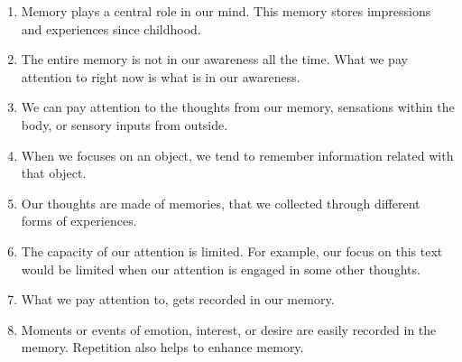 \documentclass[reprint,amsmath,amssymb,apr,aip,onecolumn, 11pt]{revtex4-1}
\begin{document}
	\begin{enumerate}
		\item Memory plays a central role in our mind. This memory stores impressions and experiences since childhood. 
		
		\item	The entire memory is not in our awareness all the time. What we pay attention to right now is what is in our awareness. 
		
		\item	We can pay attention to the thoughts from our memory,  sensations within the body, or sensory inputs from outside.
		
		\item When we  focuses on an object, we tend to remember information related with that object.  
		
		\item	Our thoughts are made of memories, that we collected through different forms of experiences. 
		
		\item	The capacity of our attention is limited. For example, our focus on this text would be limited when our attention is engaged in some other thoughts. 
		
		\item	What we pay attention to, gets recorded in our memory.  
		
		\item	Moments or events of emotion, interest, or desire are easily recorded in the memory. Repetition also helps to enhance memory.
	 	
	 	
	 	
	 \end{enumerate}
	
\end{document}
